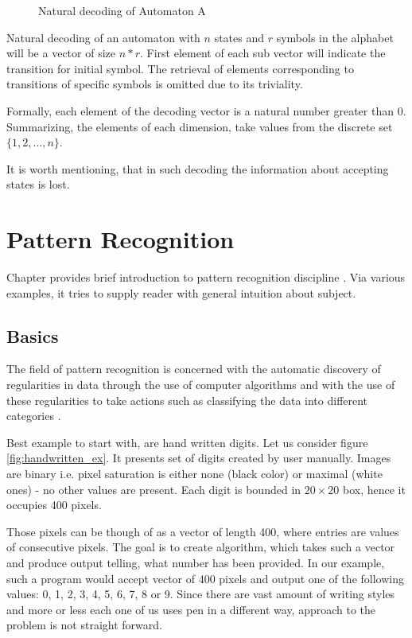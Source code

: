 \documentclass{mini}
\begin{document}
\begin{figure}[H]
\begin{center}
        \caption{Natural decoding of Automaton A}
        \label{fig:encoding}
    \end{center}
\end{figure}

Natural decoding of an automaton with $n$ states and $r$ symbols in the alphabet will be a vector of size $n*r$. First element of each sub vector will indicate the transition for initial symbol. The retrieval of elements corresponding to transitions of specific symbols is omitted due to its triviality.

Formally, each element of the decoding vector is a natural number greater than 0. Summarizing, the elements of each dimension, take values from the discrete set $\{1,2, \ldots, n\}$.

It is worth mentioning, that in such decoding the information about accepting states is lost.


\chapter{Pattern Recognition} \label{chap:patt_rec}

Chapter provides brief introduction to pattern recognition discipline . Via various examples, it tries to supply reader with general intuition about subject. 


\section{Basics}

The field of pattern recognition is concerned with the automatic discovery of regularities in data through the use of computer algorithms and with the use of these regularities to take actions such as classifying the data into different categories \cite{bishop_book}.

Best example to start with, are hand written digits. Let us consider figure \ref{fig:handwritten_ex}. It presents set of digits created by user manually. Images are binary i.e. pixel saturation is either none (black color) or maximal (white ones) - no other values are present. Each digit is bounded in $20 \times 20$ box, hence it occupies 400 pixels. 

Those pixels can be though of as a vector of length 400, where entries are values of consecutive pixels. The goal is to create algorithm, which takes such a vector and produce output telling, what number has been provided. In our example, such a program would accept vector of 400 pixels and output one of the following values: 0, 1, 2, 3, 4, 5, 6, 7, 8 or 9. Since there are vast amount of writing styles and more or less each one of us uses pen in a different way, approach to the problem is not straight forward. 
\end{document}
